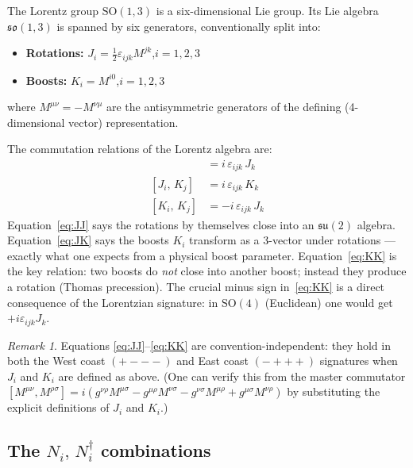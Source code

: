 \documentclass[12pt]{article}
\theoremstyle{remark}
\newtheorem*{remark}{Remark}
\begin{document}
The Lorentz group $\mathrm{SO}(1,3)$ is a six-dimensional Lie group.
Its Lie algebra $\mathfrak{so}(1,3)$ is spanned by six generators,
conventionally split into:
\begin{itemize}
  \item \textbf{Rotations:} $J_i = \tfrac{1}{2}\varepsilon_{ijk}M^{jk}$,\quad $i=1,2,3$
  \item \textbf{Boosts:} $K_i = M^{i0}$,\quad $i=1,2,3$
\end{itemize}
where $M^{\mu\nu} = -M^{\nu\mu}$ are the antisymmetric generators of the
defining (4-dimensional vector) representation.

The commutation relations of the Lorentz algebra are:
\begin{align}
  [J_i,\, J_j] &= i\,\varepsilon_{ijk}\,J_k
  \label{eq:JJ}\\
  [J_i,\, K_j] &= i\,\varepsilon_{ijk}\,K_k
  \label{eq:JK}\\
  [K_i,\, K_j] &= -i\,\varepsilon_{ijk}\,J_k
  \label{eq:KK}
\end{align}
Equation~\eqref{eq:JJ} says the rotations by themselves close into an
$\mathfrak{su}(2)$ algebra.
Equation~\eqref{eq:JK} says the boosts $K_i$ transform as a 3-vector under
rotations --- exactly what one expects from a physical boost parameter.
Equation~\eqref{eq:KK} is the key relation: two boosts do \emph{not} close
into another boost; instead they produce a rotation (Thomas precession).
The crucial minus sign in~\eqref{eq:KK} is a direct consequence of the
Lorentzian signature: in $\mathrm{SO}(4)$ (Euclidean) one would get $+i\varepsilon_{ijk}J_k$.

\begin{remark}
  Equations \eqref{eq:JJ}--\eqref{eq:KK} are convention-independent:
  they hold in both the West coast $(+{-}{-}{-})$ and East coast
  $(-{+}{+}{+})$ signatures when $J_i$ and $K_i$ are defined as above.
  (One can verify this from the master commutator
  $[M^{\mu\nu},M^{\rho\sigma}] = i(g^{\nu\rho}M^{\mu\sigma}
  - g^{\mu\rho}M^{\nu\sigma} - g^{\nu\sigma}M^{\mu\rho}
  + g^{\mu\sigma}M^{\nu\rho})$
  by substituting the explicit definitions of $J_i$ and $K_i$.)
\end{remark}

\subsection{The \texorpdfstring{$N_i,\,N_i^\dagger$}{N, N†} combinations}
\end{document}
